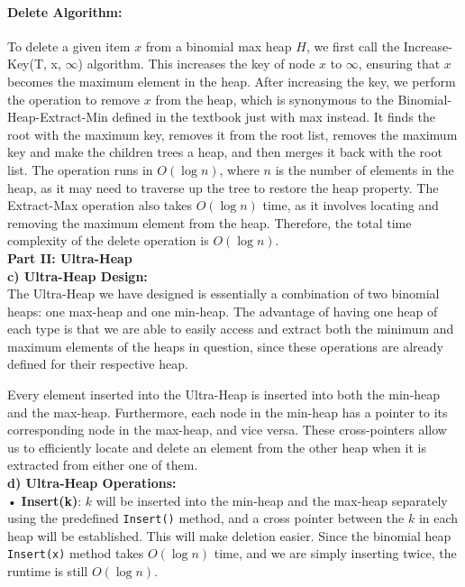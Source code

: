 \documentclass[11pt, a4paper]{article}
\begin{document}
\paragraph{Delete Algorithm:}
To delete a given item $x$ from a binomial max heap $H$, we first call the Increase-Key(T, x, $\infty$) algorithm. This increases the key of node $x$ to $\infty$, ensuring that $x$ becomes the maximum element in the heap. After increasing the key, we perform the  operation to remove $x$ from the heap, which is synonymous to the Binomial-Heap-Extract-Min defined in the textbook just with max instead. It finds the root with the maximum key, removes it from the root list, removes the maximum key and make the children trees a heap, and then merges it back with the root list. The  operation runs in \(O(\log n)\), where $n$ is the number of elements in the heap, as it may need to traverse up the tree to restore the heap property. The Extract-Max operation also takes \(O(\log n)\) time, as it involves locating and removing the maximum element from the heap. Therefore, the total time complexity of the delete operation is \(O(\log n)\).
\\

\textbf{Part II: Ultra-Heap} \\

\textbf{c) Ultra-Heap Design:} \\
The Ultra-Heap we have designed is essentially a combination of two binomial heaps: one max-heap and one min-heap. The advantage of having one heap of each type is that we are able to easily access and extract both the minimum and maximum elements of the heaps in question, since these operations are already defined for their respective heap.

Every element inserted into the Ultra-Heap is inserted into both the min-heap and the max-heap. Furthermore, each node in the min-heap has a pointer to its corresponding node in the max-heap, and vice versa. These cross-pointers allow us to efficiently locate and delete an element from the other heap when it is extracted from either one of them.\\

\textbf{d) Ultra-Heap Operations:} \\

• \textbf{Insert(k)}: \(k\) will be inserted into the min-heap and the max-heap separately using the predefined \texttt{Insert()} method, and a cross pointer between the \(k\) in each heap will be established. This will make deletion easier. Since the binomial heap \texttt{Insert(x)} method takes \(O(\log n)\) time, and we are simply inserting twice, the runtime is still \(O(\log n)\).
\end{document}
